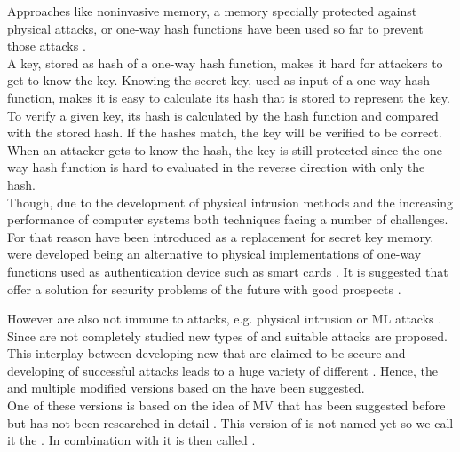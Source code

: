 Approaches like noninvasive memory, a memory specially protected against physical attacks, or one-way hash functions have been used so far to prevent those attacks \cite{Pappu2001PhysicalFunctions}.\\
A key, stored as hash of a one-way hash function, makes it hard for attackers to get to know the key. 
Knowing the secret key, used as input of a one-way hash function, makes it is easy to calculate its hash that is stored to represent the key.
To verify a given key, its hash is calculated by the hash function and compared with the stored hash.
If the hashes match, the key will be verified to be correct.
When an attacker gets to know the hash, the key is still protected since the one-way hash function is hard to evaluated in the reverse direction with only the hash.\\
Though, due to the development of physical intrusion methods and the increasing performance of computer systems both techniques facing a number of challenges.
For that reason \pufs have been introduced as a replacement for secret key memory.
\pufs were developed being an alternative to physical implementations of one-way functions used as authentication device such as smart cards \cite{Pappu2001PhysicalFunctions}.
It is suggested that \pufs offer a solution for security problems of the future with good prospects \cite{Tajik2014PhysicalPUFs}.


However \pufs are also not immune to attacks, e.g. physical intrusion or \acl{ML} attacks \cite{Tajik2014PhysicalPUFs,Ruhrmair2010ModelingFunctions,Becker2015ThePUFs,Helfmeier2014PhysicalFunctions}.
Since \pufs are not completely studied new types of \pufs and suitable attacks are proposed.\\
This interplay between developing new \pufs that are claimed to be secure and developing of successful attacks leads to a huge variety of different \pufs \cite{Ruhrmair2014PUFOverview}.
Hence, the \apuf and multiple modified versions based on the \apuf have been suggested.\\
One of these versions is based on the idea of \ac{MV} that has been suggested before but has not been researched in detail \cite{Ruhrmair2013PUFData}.
This version of \apufs is not named yet so we call it the \mpuf.
In combination with \xpufs it is then called \mxpufs.


